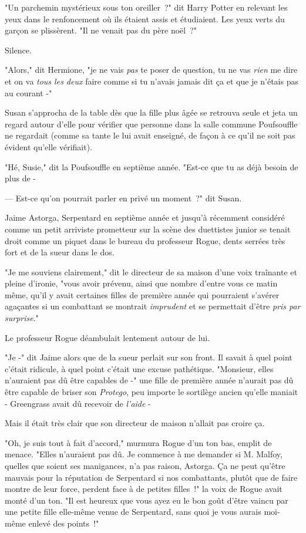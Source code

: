 \later

"Un parchemin mystérieux sous ton oreiller~?" dit Harry Potter en relevant les yeux dans le renfoncement où ils étaient assis et étudiaient. Les yeux verts du garçon se plissèrent. "Il ne venait pas du père noël~?"

Silence.

"Alors," dit Hermione, "je ne vais \emph{pas} te poser de question, tu ne vas \emph{rien} me dire et on va \emph{tous les deux} faire comme si tu n'avais jamais dit ça et que je n'étais pas au courant -"

\later

Susan s'approcha de la table dès que la fille plus âgée se retrouva seule et jeta un regard autour d'elle pour vérifier que personne dans la salle commune Poufsouffle ne regardait (comme sa tante le lui avait enseigné, de façon à ce qu'il ne soit pas évident qu'elle vérifiait).

"Hé, Susie," dit la Poufsouffle en septième année. "Est-ce que tu as déjà besoin de plus de -

--- Est-ce qu'on pourrait parler en privé un moment~?" dit Susan.

\later

Jaime Astorga, Serpentard en septième année et jusqu'à récemment considéré comme un petit arriviste prometteur sur la scène des duettistes junior se tenait droit comme un piquet dans le bureau du professeur Rogue, dents serrées très fort et de la sueur dans le dos.

"Je me souviens clairement," dit le directeur de sa maison d'une voix traînante et pleine d'ironie, "vous avoir prévenu, ainsi que nombre d'entre vous ce matin même, qu'il y avait certaines filles de première année qui pourraient s'avérer agaçantes si un combattant se montrait \emph{imprudent} et se permettait d'être \emph{pris par surprise}."

Le professeur Rogue déambulait lentement autour de lui.

"Je -" dit Jaime alors que de la sueur perlait sur son front. Il savait à quel point c'était ridicule, à quel point c'était une excuse pathétique. "Monsieur, elles n'auraient pas dû être capables de -" une fille de première année n'aurait pas dû être capable de briser son \emph{Protego}, peu importe le sortilège ancien qu'elle maniait - Greengrass avait dû recevoir de \emph{l'aide} -

Mais il était très clair que son directeur de maison n'allait pas croire ça.

"Oh, je suis tout à fait d'accord," murmura Rogue d'un ton bas, emplit de menace. "Elles n'auraient pas dû. Je commence à me demander si M. Malfoy, quelles que soient ses manigances, n'a pas raison, Astorga. Ça ne peut qu'être mauvais pour la réputation de Serpentard si nos combattants, plutôt que de faire montre de leur force, perdent face à de petites filles~!" la voix de Rogue avait monté d'un ton. "Il est heureux que vous ayez eu le bon goût d'être vaincu par une petite fille elle-même venue de Serpentard, sans quoi je vous aurais moi-même enlevé des points~!"

